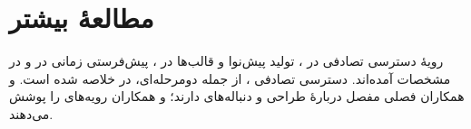 \documentclass[11pt,a4paper]{article}
\begin{document}
\section{مطالعهٔ بیشتر}
رویهٔ دسترسی تصادفی  در \cite{ts36321}، تولید پیش‌نوا و قالب‌ها در \cite{ts36211}، پیش‌فرستی زمانی در
\cite{ts36213} و  در مشخصات  \cite{ts36331} آمده‌اند. دسترسی تصادفی ، از جمله 
دومرحله‌ای، در \cite{ts38300} خلاصه شده است.  و همکاران \cite{sesia2011lte} فصلی مفصل دربارهٔ طراحی
 و دنباله‌های  دارند؛  و همکاران \cite{dahlman2020nr} رویه‌های  را پوشش می‌دهند.

\begin{latin}
\printbibliography[heading=subbibliography,title={References}]
\end{latin}
\end{document}
